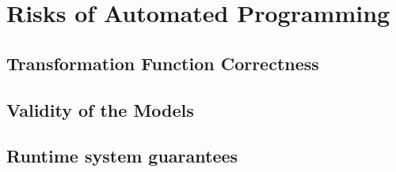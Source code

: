 \section{Risks of Automated Programming}
\label{sec:risks}

\subsection{Transformation Function Correctness}


\subsection{Validity of the Models}

\subsection{Runtime system guarantees}